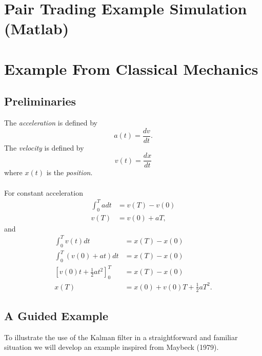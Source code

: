 \documentclass{article}
\theoremstyle{definition}
\theoremstyle{remark}
\begin{document}
\newpage
\section{Pair Trading Example Simulation (Matlab)}\label{app:pairTrading}







\newpage
\section{Example From Classical Mechanics}\label{sec:meca}
\subsection{Preliminaries}
The \emph{acceleration} is defined by
$$a(t)=\frac{dv}{dt}.$$
The \emph{velocity} is defined by
$$v(t)=\frac{dx}{dt}$$
where $x(t)$ is the \emph{position}.\\
\\
For constant acceleration
\begin{align*}
\int_0^T a dt&=v(T)-v(0)\\
v(T)&=v(0)+aT,
\end{align*}
and
\begin{align*}
\int_0^T v(t) dt&=x(T)-x(0)\\
\int_0^T (v(0)+at) dt&=x(T)-x(0)\\
[v(0)t+\frac{1}{2}at^2]_0^T&=x(T)-x(0)\\
x(T)&=x(0)+v(0)T+\frac{1}{2}aT^2.
\end{align*}








\subsection{A Guided Example}
To illustrate the use of the Kalman filter in a straightforward and familiar situation we will develop an example inspired from Maybeck (1979). \\
\end{document}
